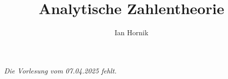 \documentclass[a4paper, 11pt]{../../defs/lecture-notes}
\title{Analytische Zahlentheorie}
\author{Ian Hornik}
\begin{document}
\maketitle

\tableofcontents





\textit{Die Vorlesung vom 07.04.2025 fehlt.}

\end{document}
